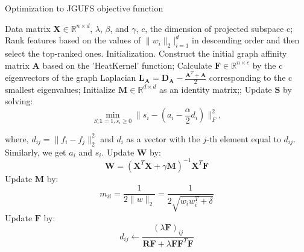 \documentclass[a0paper,portrait]{baposter}
\begin{document}
\begin{poster}
{\begin{algorithm}[H]
  \renewcommand{\algorithmicrequire}{\textbf{Input:}}
  \renewcommand{\algorithmicensure}{\textbf{Output:}}
  \caption{Optimization to JGUFS objective function}
    \begin{algorithmic}[1]
    \REQUIRE Data matrix $\mathbf{X}\in\mathbb{R}^{n\times d}$, $\lambda$, $\beta$, and $\gamma$, $c$, the dimension of projected subspace c;
    \ENSURE Rank features based on the values of $\|w_i\|_2|_{i=1}^d$ in descending order and then select the top-ranked ones.
    \STATE Initialization. Construct the initial graph affinity matrix $\mathbf{A}$ based on the 'HeatKernel' function; Calculate $\mathbf{F}\in\mathbb{R}^{n\times c}$ by the c eigenvectors of the graph Laplacian $\mathbf{L_A}=\mathbf{D_A}-\frac{\mathbf{A}^T+\mathbf{A}}{2}$ corresponding to the c smallest eigenvalues; Initialize $\mathbf{M}\in\mathbb{R}^{d\times d}$ as an identity matrix;;
    \STATE Update $\mathbf{S}$ by solving:
    \vspace{-10pt}
    \begin{equation}\nonumber
        \min_{S_i\mathbf{1}=1,s_i\ge0}\|s_i-(a_i-\frac{\alpha}{2}d_i)\|_F^2,
    \end{equation}
    
    where, $d_{ij}=\|f_i-f_j\|_2^2$ and $d_i$ as a vector with the $j$-th element equal to $d_{ij}$. Similarly, we get $a_i$ and $s_i$.
    \STATE Update $\mathbf{W}$ by:
    \vspace{-7pt}
    \begin{equation}\nonumber
       \mathbf{W}=(\mathbf{X}^T\mathbf{X}+\gamma\mathbf{M})^{-1}\mathbf{X}^T\mathbf{F}
    \end{equation}
    \vspace{-15pt}
    \STATE Update $\mathbf{M}$ by:
    \vspace{-7pt}
    \begin{equation}\nonumber
        m_{ii}=\frac{1}{2\|w\|_2}=\frac{1}{2\sqrt{w_iw_i^T+\delta}}
    \end{equation}
    \vspace{-10pt}
    \STATE Update $\mathbf{F}$ by:
    \vspace{-10pt}
    \begin{equation}\nonumber
        d_{ij} \leftarrow \frac{(\lambda \mathbf{F})_{ij}}{\mathbf{R}\mathbf{F}+\lambda\mathbf{FF}^T\mathbf{F}}
    \end{equation}
    \vspace{-15pt}
    \ENDWHILE
    \end{algorithmic}
    \label{alg:1}
\end{algorithm}

}
\end{poster}
\end{document}
